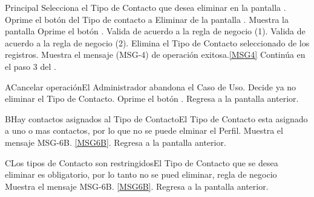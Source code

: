 	\begin{UCtrayectoria}{Principal}
			\UCpaso[\UCactor] Selecciona el Tipo de Contacto que desea eliminar en la pantalla .
			\UCpaso[\UCactor] Oprime el botón  del Tipo de contacto a Eliminar de la pantalla .
			\UCpaso Muestra la pantalla 
			\UCpaso [\UCactor] Oprime el botón .
                        \UCpaso Valida de acuerdo a la regla de negocio (1).  
			\UCpaso Valida de acuerdo a la regla de negocio (2).  
                        \UCpaso Elimina el Tipo de Contacto seleccionado de los registros.
			\UCpaso Muestra el mensaje (MSG-4) de operación exitosa.\ref{MSG4}
			\UCpaso Continúa en el paso 3 del .
	\end{UCtrayectoria}

		\begin{UCtrayectoriaA}{A}{Cancelar operación}{El Administrador abandona el Caso de Uso.}
			\UCpaso[\UCactor] Decide ya no eliminar el Tipo de Contacto.
			\UCpaso[\UCactor] Oprime el botón .
			\UCpaso Regresa a la pantalla anterior.
		\end{UCtrayectoriaA}

		\begin{UCtrayectoriaA}{B}{Hay contactos asignados al Tipo de Contacto}{El Tipo de Contacto esta asignado a uno o mas contactos, por lo que no se puede elminar el Perfil.}
			\UCpaso Muestra el mensaje MSG-6B. \ref{MSG6B}.
			\UCpaso Regresa a la pantalla anterior.
		\end{UCtrayectoriaA}	

		\begin{UCtrayectoriaA}{C}{Los tipos de Contacto son restringidos}{El Tipo de Contacto que se desea eliminar es obligatorio, por lo tanto no se pued eliminar, regla de negocio }
			\UCpaso Muestra el mensaje MSG-6B.  \ref{MSG6B}.
			\UCpaso Regresa a la pantalla anterior.
		\end{UCtrayectoriaA}	
		
